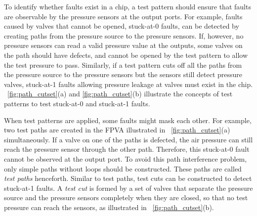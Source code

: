 \documentclass[journal,twoside]{IEEEtran}
\begin{document}
To identify whether faults exist in a chip, a test pattern should ensure
that faults are observable by the pressure sensors at the output ports.
For example, faults caused by valves that cannot be opened, stuck-at-0 faults, 
can be detected by creating paths from the pressure source to the pressure
sensors. If, however, no pressure sensors can read a valid pressure value at
the outputs, some valves on the path should have defects, and cannot
be opened by the test pattern to allow the test pressure to pass. 
Similarly, if a test pattern 
cuts off all the paths 
from the pressure source to the pressure sensors but 
the sensors still detect pressure valves, 
stuck-at-1 faults allowing pressure leakage at valves must exist in the chip.
\figname~\ref{fig:path_cutset}(a) and \ref{fig:path_cutset}(b) 
illustrate the concepts of test patterns to
test stuck-at-0 and stuck-at-1 faults.

When test patterns are applied, some faults might mask each other. For
example, two test paths are created in the FPVA illustrated in
\figname~\ref{fig:path_cutset}(a) simultaneously. If a valve on one of the paths is defected, the
air pressure can still reach the pressure sensor through the other path.
Therefore, this stuck-at-0 fault cannot be observed at the output port.
To avoid this path interference problem, only simple paths without loops should
be constructed. These paths are called \textit{test paths} henceforth.
Similar to test paths,
test cuts can be constructed to detect stuck-at-1 faults. 
A \textit{test cut}
is formed by a set of valves that separate the pressure source and the pressure
sensors completely when they are closed, so that no test pressure can reach
the sensors, as illustrated in \figname~\ref{fig:path_cutset}(b).
\end{document}
